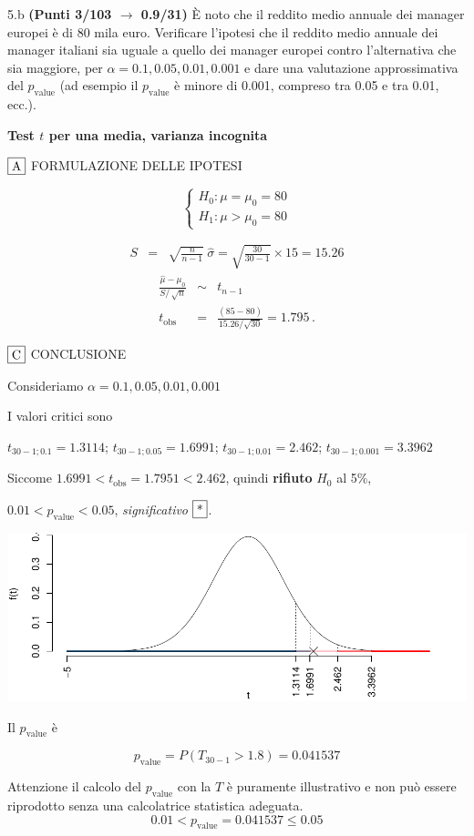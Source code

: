 \documentclass[
  11pt,
]{book}
\theoremstyle{mytheoremstyle}
\theoremstyle{mydefstyle}
\newenvironment{sol}
  {
  \begin{tcolorbox}[enhanced,breakable,arc=0.1mm,boxrule=1pt,colback=white,colframe=iblue,
  title=\bf \fontfamily{lmss}\selectfont \hspace{.5 cm} Soluzione,drop fuzzy shadow]

}{
\end{tcolorbox}
  }
\begin{document}
5.b \textbf{(Punti 3/103 \(\rightarrow\) 0.9/31)} È noto che il reddito medio annuale dei manager europei
è di 80 mila euro.
Verificare l'ipotesi
che il reddito medio annuale dei manager italiani sia uguale a quello
dei manager europei contro l'alternativa che sia maggiore, per \(\alpha=0.1,0.05,0.01,0.001\) e dare una valutazione approssimativa del \(p_\text{value}\) (ad esempio il \(p_\text{value}\) è minore di 0.001, compreso tra 0.05 e tra 0.01, ecc.).

\begin{sol}
\textbf{Test \(t\) per una media, varianza incognita}

\(\fbox{A}\) FORMULAZIONE DELLE IPOTESI

\[\begin{cases}
   H_0: \mu = \mu_0=80 \\
   H_1: \mu > \mu_0=80 
   \end{cases}\]

\begin{eqnarray*}
   S    &=& \sqrt{\frac{n} {n-1}}\ \widehat{\sigma} 
   =  \sqrt{\frac{ 30 } { 30 -1}} \times  15  =  15.26 
   \end{eqnarray*}
\begin{eqnarray*}
   \frac{\hat\mu - \mu_{0}} {S/\,\sqrt{n}}&\sim&t_{n-1}\\
   t_{\text{obs}}
   &=& \frac{ ( 85 -  80 )} { 15.26 /\sqrt{ 30 }}
   =   1.795 \, .
   \end{eqnarray*}

\(\fbox{C}\) CONCLUSIONE

Consideriamo \(\alpha=0.1, 0.05, 0.01, 0.001\)

I valori critici sono

\(t_{30-1;0.1}=1.3114\); \(t_{30-1;0.05}=1.6991\); \(t_{30-1;0.01}=2.462\); \(t_{30-1;0.001}=3.3962\)

Siccome \(1.6991<t_\text{obs}=1.7951<2.462\), quindi \textbf{rifiuto} \(H_0\) al 5\%,

\(0.01<p_\text{value}<0.05\), \emph{significativo} \(\fbox{*}\).

\begin{center}\includegraphics{Esami_passati_con_soluzioni_files/figure-latex/2024-27,-1} \end{center}

Il \(p_{\text{value}}\) è

\[ p_{\text{value}} = P(T_{30-1}>1.8)=0.041537 \]

Attenzione il calcolo del \(p_\text{value}\) con la \(T\) è puramente illustrativo e non può essere riprodotto senza una calcolatrice statistica adeguata.\[
 0.01 < p_\text{value}= 0.041537 \leq 0.05 
\]

\end{sol}
\end{document}

